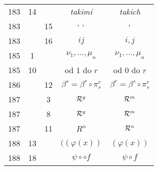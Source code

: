 \documentclass[a4paper,11pt]{article}
\begin{document}
\begin{center}
\begin{tabular}{|c|c|c|c|c|}
    183 & 14 & & \textit{takimi} & \textit{takich} \\
    183 & & 15 & $,\, ,$ & $,$ \\
    183 & & 16 & $ij$ & $i, j$ \\
    185 & \hphantom{0}1 & & $\nu_{ 1 },\!\ldots,\! \mu_{ n }$
           & $\nu_{ 1 }, \ldots, \mu_{ n }$ \\
    185 & 10 & & od 1 do $r$ & od 0 do $r$ \\
    186 & & 12 & $\beta^{ s } = \beta^{ r } \circ \pi^{ r }_{ s }$
    & $\beta^{ r } = \beta^{ s } \circ \pi^{ r }_{ s }$ \\
    187 & & \hphantom{0}3 & $\mathcal{R}^{ y }$ & $\mathcal{R}^{ m }$ \\
    187 & & \hphantom{0}8 & $\mathcal{R}^{ y }$ & $\mathcal{R}^{ m }$ \\
    187 & & 11 & $R^{ n }$ & $\mathcal{R}^{ n }$ \\
    188 & 13 & & $( ( \varphi( x ) )$ & $( \varphi( x ) )$ \\
    188 & 18 & & $\psi \circ \circ f$ & $\psi \circ f$ \\
    \hline
  \end{tabular}





  \newpage


\end{center}
\end{document}
